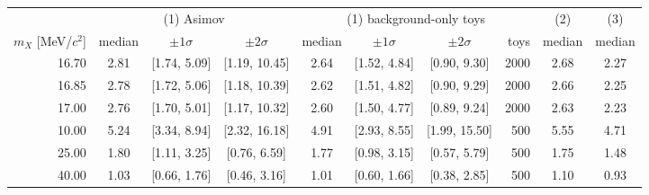 \begin{tabular}{r ccc cccr cc}
\toprule
 & \multicolumn{3}{c}{(1) Asimov} & \multicolumn{4}{c}{(1) background-only toys} & (2) & (3) \\
$m_X$ [MeV/$c^2$] & median & $\pm1\sigma$ & $\pm2\sigma$ & median & $\pm1\sigma$ & $\pm2\sigma$ & toys & median & median \\
\midrule
16.70 & 2.81 & [1.74, 5.09] & [1.19, 10.45] & 2.64 & [1.52, 4.84] & [0.90, 9.30] & 2000 & 2.68 & 2.27 \\
16.85 & 2.78 & [1.72, 5.06] & [1.18, 10.39] & 2.62 & [1.51, 4.82] & [0.90, 9.29] & 2000 & 2.66 & 2.25 \\
17.00 & 2.76 & [1.70, 5.01] & [1.17, 10.32] & 2.60 & [1.50, 4.77] & [0.89, 9.24] & 2000 & 2.63 & 2.23 \\
10.00 & 5.24 & [3.34, 8.94] & [2.32, 16.18] & 4.91 & [2.93, 8.55] & [1.99, 15.50] & 500 & 5.55 & 4.71 \\
25.00 & 1.80 & [1.11, 3.25] & [0.76, 6.59] & 1.77 & [0.98, 3.15] & [0.57, 5.79] & 500 & 1.75 & 1.48 \\
40.00 & 1.03 & [0.66, 1.76] & [0.46, 3.16] & 1.01 & [0.60, 1.66] & [0.38, 2.85] & 500 & 1.10 & 0.93 \\
\bottomrule
\end{tabular}
